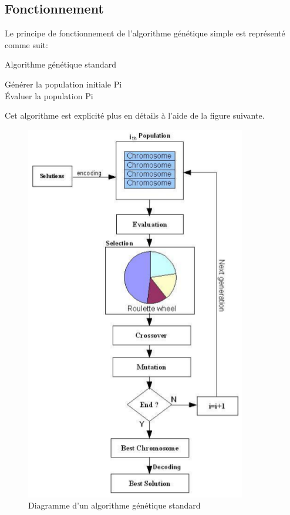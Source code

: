 \documentclass[12pt,a4paper]{article}
\begin{document}
	\subsection{Fonctionnement}
	
	Le principe de fonctionnement de l'algorithme génétique simple est représenté comme suit: \\
	 
	\begin{algorithm}[H]
 	\caption{Algorithme génétique standard}
 	Générer la population initiale Pi \\
 	Évaluer la population Pi \\
	\end{algorithm}
	
	\vspace*{1cm}
	Cet algorithme est explicité plus en détails à l'aide de la figure suivante.
	
	\begin{figure}[!h]
		\begin{center}
			\includegraphics[scale=.5]{img/genetic_algo_flowchart.png}
			\caption{Diagramme d'un algorithme génétique standard}
		\end{center}
	\end{figure}
	
\end{document}
